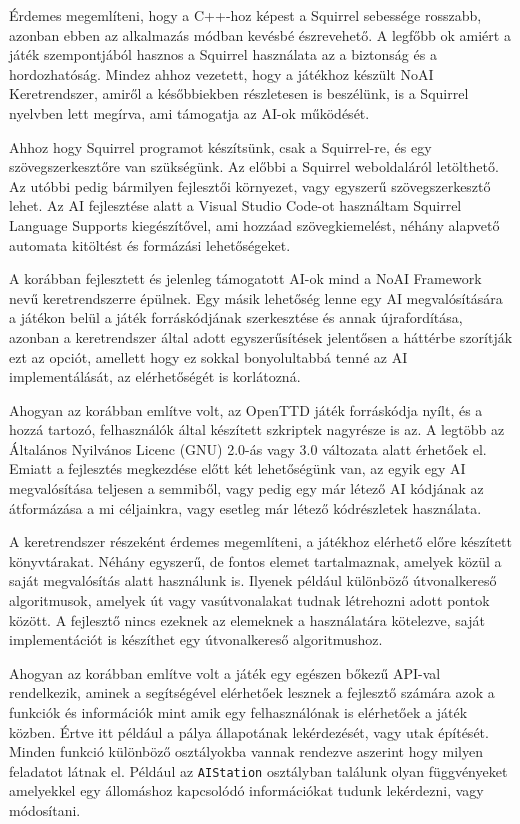 Érdemes megemlíteni, hogy a C++-hoz képest a Squirrel sebessége rosszabb, azonban ebben az alkalmazás módban kevésbé észrevehető. A legfőbb ok amiért a játék szempontjából hasznos a Squirrel használata az a biztonság és a hordozhatóság. Mindez ahhoz vezetett, hogy a játékhoz készült NoAI Keretrendszer, amiről a későbbiekben részletesen is beszélünk, is a Squirrel nyelvben lett megírva, ami támogatja az AI-ok működését.

Ahhoz hogy Squirrel programot készítsünk, csak a Squirrel-re, és egy szövegszerkesztőre van szükségünk. Az előbbi a Squirrel weboldaláról letölthető. Az utóbbi pedig bármilyen fejlesztői környezet, vagy egyszerű szövegszerkesztő lehet. Az AI fejlesztése alatt a Visual Studio Code-ot használtam Squirrel Language Supports kiegészítővel, ami hozzáad szövegkiemelést, néhány alapvető automata kitöltést és formázási lehetőségeket.



A korábban fejlesztett és jelenleg támogatott AI-ok mind a NoAI Framework nevű keretrendszerre épülnek. Egy másik lehetőség lenne egy AI megvalósítására a játékon belül a játék forráskódjának szerkesztése és annak újrafordítása, azonban a keretrendszer által adott egyszerűsítések jelentősen a háttérbe szorítják ezt az opciót, amellett hogy ez sokkal bonyolultabbá tenné az AI implementálását, az elérhetőségét is korlátozná.

Ahogyan az korábban említve volt, az OpenTTD játék forráskódja nyílt, és a hozzá tartozó, felhasználók által készített szkriptek nagyrésze is az. A legtöbb az Általános Nyilvános Licenc (GNU) 2.0-ás vagy 3.0 változata alatt érhetőek el. Emiatt a fejlesztés megkezdése előtt két lehetőségünk van, az egyik egy AI megvalósítása teljesen a semmiből, vagy pedig egy már létező AI kódjának az átformázása a mi céljainkra, vagy esetleg már létező kódrészletek használata.

A keretrendszer részeként érdemes megemlíteni, a játékhoz elérhető előre készített könyvtárakat. Néhány egyszerű, de fontos elemet tartalmaznak, amelyek közül a saját megvalósítás alatt használunk is. Ilyenek például különböző útvonalkereső algoritmusok, amelyek út vagy vasútvonalakat tudnak létrehozni adott pontok között. A fejlesztő nincs ezeknek az elemeknek a használatára kötelezve, saját implementációt is készíthet egy útvonalkereső algoritmushoz.



Ahogyan az korábban említve volt a játék egy egészen bőkezű API-val rendelkezik, aminek a segítségével elérhetőek lesznek a fejlesztő számára azok a funkciók és információk mint amik egy felhasználónak is elérhetőek a játék közben. Értve itt például a pálya állapotának lekérdezését, vagy utak építését. Minden funkció különböző osztályokba vannak rendezve aszerint hogy milyen feladatot látnak el. Például az \texttt{AIStation} osztályban találunk olyan függvényeket amelyekkel egy állomáshoz kapcsolódó információkat tudunk lekérdezni, vagy módosítani.

